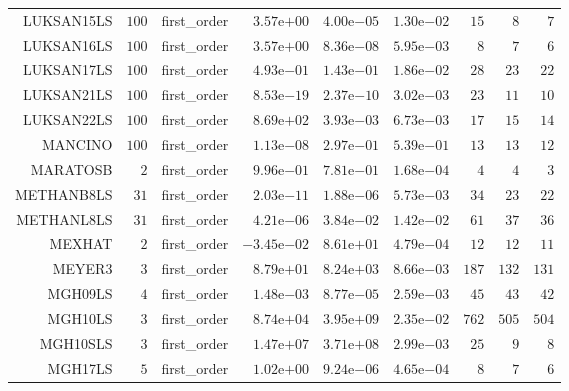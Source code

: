 \begin{longtable}{rrrrrrrrr}
LUKSAN15LS & \(   100\) & first\_order & \( 3.57\)e\(+00\) & \( 4.00\)e\(-05\) & \( 1.30\)e\(-02\) & \(    15\) & \(     8\) & \(     7\) \\
LUKSAN16LS & \(   100\) & first\_order & \( 3.57\)e\(+00\) & \( 8.36\)e\(-08\) & \( 5.95\)e\(-03\) & \(     8\) & \(     7\) & \(     6\) \\
LUKSAN17LS & \(   100\) & first\_order & \( 4.93\)e\(-01\) & \( 1.43\)e\(-01\) & \( 1.86\)e\(-02\) & \(    28\) & \(    23\) & \(    22\) \\
LUKSAN21LS & \(   100\) & first\_order & \( 8.53\)e\(-19\) & \( 2.37\)e\(-10\) & \( 3.02\)e\(-03\) & \(    23\) & \(    11\) & \(    10\) \\
LUKSAN22LS & \(   100\) & first\_order & \( 8.69\)e\(+02\) & \( 3.93\)e\(-03\) & \( 6.73\)e\(-03\) & \(    17\) & \(    15\) & \(    14\) \\
MANCINO & \(   100\) & first\_order & \( 1.13\)e\(-08\) & \( 2.97\)e\(-01\) & \( 5.39\)e\(-01\) & \(    13\) & \(    13\) & \(    12\) \\
MARATOSB & \(     2\) & first\_order & \( 9.96\)e\(-01\) & \( 7.81\)e\(-01\) & \( 1.68\)e\(-04\) & \(     4\) & \(     4\) & \(     3\) \\
METHANB8LS & \(    31\) & first\_order & \( 2.03\)e\(-11\) & \( 1.88\)e\(-06\) & \( 5.73\)e\(-03\) & \(    34\) & \(    23\) & \(    22\) \\
METHANL8LS & \(    31\) & first\_order & \( 4.21\)e\(-06\) & \( 3.84\)e\(-02\) & \( 1.42\)e\(-02\) & \(    61\) & \(    37\) & \(    36\) \\
MEXHAT & \(     2\) & first\_order & \(-3.45\)e\(-02\) & \( 8.61\)e\(+01\) & \( 4.79\)e\(-04\) & \(    12\) & \(    12\) & \(    11\) \\
MEYER3 & \(     3\) & first\_order & \( 8.79\)e\(+01\) & \( 8.24\)e\(+03\) & \( 8.66\)e\(-03\) & \(   187\) & \(   132\) & \(   131\) \\
MGH09LS & \(     4\) & first\_order & \( 1.48\)e\(-03\) & \( 8.77\)e\(-05\) & \( 2.59\)e\(-03\) & \(    45\) & \(    43\) & \(    42\) \\
MGH10LS & \(     3\) & first\_order & \( 8.74\)e\(+04\) & \( 3.95\)e\(+09\) & \( 2.35\)e\(-02\) & \(   762\) & \(   505\) & \(   504\) \\
MGH10SLS & \(     3\) & first\_order & \( 1.47\)e\(+07\) & \( 3.71\)e\(+08\) & \( 2.99\)e\(-03\) & \(    25\) & \(     9\) & \(     8\) \\
MGH17LS & \(     5\) & first\_order & \( 1.02\)e\(+00\) & \( 9.24\)e\(-06\) & \( 4.65\)e\(-04\) & \(     8\) & \(     7\) & \(     6\) \\

\end{longtable}
